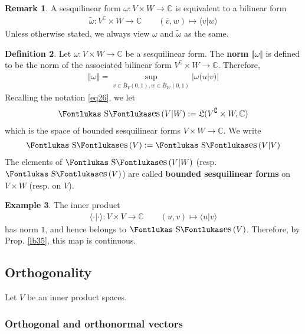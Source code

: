 \documentclass[12pt,b5paper,notitlepage]{article}
\theoremstyle{definition}
\newtheorem{df}{Definition}[section]
\newtheorem{eg}[df]{Example}
\newtheorem{rem}[df]{Remark}
\theoremstyle{plain}
\DeclareMathOperator{\Ses}{\text{\Fontlukas S}\text{\kern -0pt {\Fontlukas\large es}}\,}
\newcommand{\fk}{\mathfrak}
\newcommand{\wtd}{\widetilde}
\newcommand{\ovl}{\overline}
\newcommand{\bk}[1]{\langle {#1}\rangle}
\newcommand{\Co}{\complement}
\newcommand{\Cbb}{\mathbb C}
\numberwithin{equation}{section}
\begin{document}
\begin{rem}
A sesquilinear form $\omega:V\times W\rightarrow \Cbb$ is equivalent to a bilinear form
\begin{align*}
\wtd\omega:V^\Co\times W\rightarrow\Cbb\qquad (\ovl v,w)\mapsto \bk{v|w}
\end{align*}
Unless otherwise stated, we always view $\omega$ and $\wtd\omega$ as the same.
\end{rem}

\begin{df}
Let $\omega:V\times W\rightarrow\Cbb$ be a sesquilinear form. The \textbf{norm}  $\Vert\omega\Vert$ is defined to be the norm of the associated bilinear form $V^\Co\times W\rightarrow\Cbb$. Therefore, 
\begin{align*}
\Vert\omega\Vert=\sup_{v\in\ovl B_V(0,1),w\in\ovl B_W(0,1)}|\omega(u|v)|
\end{align*}
Recalling the notation \eqref{eq26}, we let \index{Sesq@$\Ses(V\vert W)$ and $\Ses(V)$}
\begin{align*}
\Ses(V|W):=\fk L(V^\Co\times W,\Cbb)
\end{align*}
which is the space of bounded sesquilinear forms $V\times W\rightarrow\Cbb$. We write
\begin{align*}
\Ses(V):=\Ses(V|V)
\end{align*}
The elements of $\Ses(V|W)$ (resp. $\Ses(V)$) are called \textbf{bounded sesquilinear forms}  on $V\times W$ (resp. on $V$).
\end{df}


\begin{eg}\label{lb125}
The inner product
\begin{align*}
\bk{\cdot|\cdot}:V\times V\rightarrow\Cbb\qquad (u,v)\mapsto\bk{u|v}
\end{align*}
has norm $1$, and hence belongs to $\Ses(V)$. Therefore, by Prop. \ref{lb35}, this map is continuous.
\end{eg}



\subsection{Orthogonality}



Let $V$ be an inner product spaces.



\subsubsection{Orthogonal and orthonormal vectors}
\end{document}
